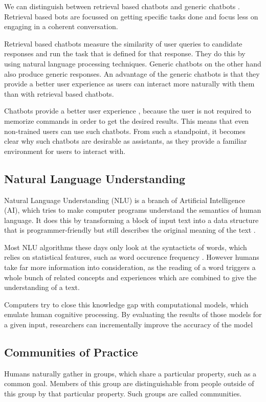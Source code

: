 We can distinguish between retrieval based chatbots and generic chatbots \cite{NLKl19,WWX*16}. Retrieval based bots are focussed on getting specific tasks done and focus less on engaging in a coherent conversation.

Retrieval based chatbots measure the similarity of user queries to candidate responses and run the task that is defined for that response. They do this by using natural language processing techniques. Generic chatbots on the other hand also produce generic responses. An advantage of the generic chatbots is that they provide a better user experience as users can interact more naturally with them than with retrieval based chatbots.

Chatbots provide a better user experience \cite{CHW*17}, because the user is not required to memorize commands in order to get the desired results. This means that even non-trained users can use such chatbots. From such a standpoint, it becomes clear why such chatbots are desirable as assistants, as they provide a familiar environment for users to interact with.

\subsection{Natural Language Understanding}
Natural Language Understanding (NLU) is a branch of Artificial Intelligence (AI), which tries to make computer programs understand the semantics of human language. It does this by transforming a block of input text into a data structure that is programmer-friendly but still describes the original meaning of the text \cite{CWB*11}.

Most NLU algorithms these days only look at the syntacticts of words, which relies on statistical features, such as word occurence frequency \cite{CaWh14}. However humans take far more information into consideration, as the reading of a word triggers a whole bunch of related concepts and experiences which are combined to give the understanding of a text.

Computers try to close this knowledge gap with computational models, which emulate human cognitive processing. By evaluating the results of those models for a given input, researchers can incrementally improve the accuracy of the model \cite{CaWh14}


\subsection{Communities of Practice}
Humans naturally gather in groups, which share a particular property, such as a common goal.
Members of this group are distinguishable from people outside of this group by that particular property.
Such groups are called communities.

